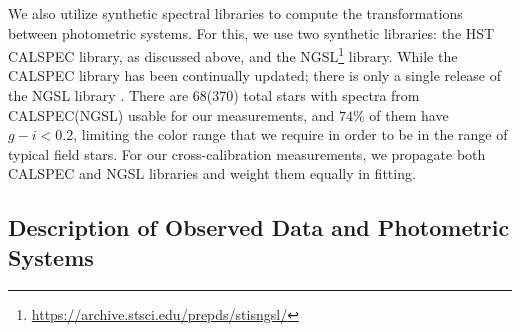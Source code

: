 \documentclass[twocolumn]{aastex63}
\begin{document}
We also utilize synthetic spectral libraries to compute the transformations between photometric systems.  For this, we use two synthetic libraries: the HST CALSPEC library, as discussed above, and the NGSL\footnote{\href{https://archive.stsci.edu/prepds/stisngsl/}{https://archive.stsci.edu/prepds/stisngsl/}} library.  While the CALSPEC library has been continually updated; there is only a single release of the NGSL library \citep{ngsl}.  There are 68(370) total stars with spectra from CALSPEC(NGSL) usable for our measurements, and $74\%$ of them have $g-i<0.2$, limiting the color range that we require in order to be in the range of typical field stars. For our cross-calibration measurements, we propagate both CALSPEC and NGSL libraries and weight them equally in fitting. 



\subsection{Description of Observed Data and Photometric Systems}
\end{document}
